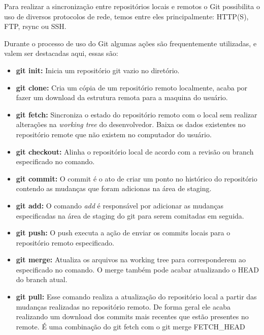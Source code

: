 \documentclass[twosideprint]{politex}
\begin{document}
	Para realizar a sincronização entre repositórios locais e remotos o Git possibilita o uso de diversos protocolos de rede, temos entre eles principalmente: HTTP(S), FTP, rsync ou SSH.
	
	Durante o processo de uso do Git algumas ações são frequentemente utilizadas, e valem ser destacadas aqui, essas são:
	\begin{itemize}
    	\item \textbf{git init:} 
    	Inicia um repositório git vazio no diretório.
    	
    	\item \textbf{git clone:}
    	Cria um cópia de um repositório remoto localmente, acaba por fazer um download da estrutura remota para a maquina do usuário.
    	
    	\item \textbf{git fetch:}
	    Sincroniza o estado do repositório remoto com o local sem realizar alterações na \textit{working tree} do desenvolvedor. Baixa os dados existentes no repositório remote que não existem no computador do usuário.
	
    	\item \textbf{git checkout:}
    	Alinha o repositório local de acordo com a revisão ou branch especificado no comando.
    	
    	\item \textbf{git commit:}
    	O commit é o ato de criar um ponto no histórico do repositório contendo as mudanças que foram adicionas na área de staging.
    	
    	\item \textbf{git add:}
    	O comando \textit{add} é responsável por adicionar as mudanças especificadas na área de staging do git para serem comitadas em seguida.
    	
    	\item \textbf{git push:}
    	O push executa a ação de enviar os commits locais para o repositório remoto especificado.
    	
    	\item \textbf{git merge:}
    	Atualiza os arquivos na working tree para corresponderem ao especificado no comando. O merge também pode acabar atualizando o HEAD do branch atual.
    	
    	\item \textbf{git pull:}
    	Esse comando realiza a atualização do repositório local a partir das mudanças realizadas no repositório remoto. De forma geral ele acaba realizando um download dos commits mais recentes que estão presentes no remote. É uma combinação do git fetch com o git merge FETCH\_HEAD
	\end{itemize}
\end{document}
